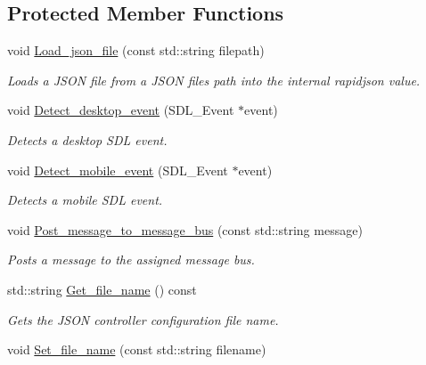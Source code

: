 \subsection*{Protected Member Functions}
\begin{DoxyCompactItemize}
\item 
void \hyperlink{classjetfuel_1_1control_1_1UIS__manager_ac24dcfc57f2b9464571ce15b40fafa2c}{Load\+\_\+json\+\_\+file} (const std\+::string filepath)
\begin{DoxyCompactList}\small\item\em Loads a J\+S\+ON file from a J\+S\+ON file\textquotesingle{}s path into the internal rapidjson value. \end{DoxyCompactList}\item 
void \hyperlink{classjetfuel_1_1control_1_1UIS__manager_aed8de35f5209e88eda4dbb87c313420c}{Detect\+\_\+desktop\+\_\+event} (S\+D\+L\+\_\+\+Event $\ast$event)
\begin{DoxyCompactList}\small\item\em Detects a desktop S\+DL event. \end{DoxyCompactList}\item 
void \hyperlink{classjetfuel_1_1control_1_1UIS__manager_a6de02ffd734406ff5187937cf951e297}{Detect\+\_\+mobile\+\_\+event} (S\+D\+L\+\_\+\+Event $\ast$event)
\begin{DoxyCompactList}\small\item\em Detects a mobile S\+DL event. \end{DoxyCompactList}\item 
void \hyperlink{classjetfuel_1_1control_1_1UIS__manager_a1550f61f5aabf96baa3ea4dc9ccb0988}{Post\+\_\+message\+\_\+to\+\_\+message\+\_\+bus} (const std\+::string message)
\begin{DoxyCompactList}\small\item\em Posts a message to the assigned message bus. \end{DoxyCompactList}\item 
std\+::string \hyperlink{classjetfuel_1_1control_1_1UIS__manager_af905f08ba629b3556966f655f24b0b0f}{Get\+\_\+file\+\_\+name} () const
\begin{DoxyCompactList}\small\item\em Gets the J\+S\+ON controller configuration file name. \end{DoxyCompactList}\item 
void \hyperlink{classjetfuel_1_1control_1_1UIS__manager_aa68c473946c11071c3222d63affcfbd4}{Set\+\_\+file\+\_\+name} (const std\+::string filename)

\end{DoxyCompactItemize}

